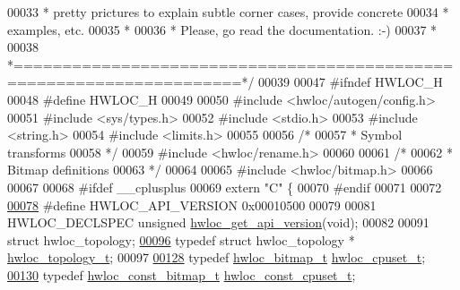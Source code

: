 \begin{DoxyCode}
00033 \textcolor{comment}{ * pretty prictures to explain subtle corner cases, provide concrete}
00034 \textcolor{comment}{ * examples, etc.}
00035 \textcolor{comment}{ *}
00036 \textcolor{comment}{ * Please, go read the documentation.  :-)}
00037 \textcolor{comment}{ *}
00038 \textcolor{comment}{ *=====================================================================*/}
00039 
00047 \textcolor{preprocessor}{#ifndef HWLOC\_H}
00048 \textcolor{preprocessor}{}\textcolor{preprocessor}{#define HWLOC\_H}
00049 \textcolor{preprocessor}{}
00050 \textcolor{preprocessor}{#include <hwloc/autogen/config.h>}
00051 \textcolor{preprocessor}{#include <sys/types.h>}
00052 \textcolor{preprocessor}{#include <stdio.h>}
00053 \textcolor{preprocessor}{#include <string.h>}
00054 \textcolor{preprocessor}{#include <limits.h>}
00055 
00056 \textcolor{comment}{/*}
00057 \textcolor{comment}{ * Symbol transforms}
00058 \textcolor{comment}{ */}
00059 \textcolor{preprocessor}{#include <hwloc/rename.h>}
00060 
00061 \textcolor{comment}{/*}
00062 \textcolor{comment}{ * Bitmap definitions}
00063 \textcolor{comment}{ */}
00064 
00065 \textcolor{preprocessor}{#include <hwloc/bitmap.h>}
00066 
00067 
00068 \textcolor{preprocessor}{#ifdef \_\_cplusplus}
00069 \textcolor{preprocessor}{}\textcolor{keyword}{extern} \textcolor{stringliteral}{"C"} \{
00070 \textcolor{preprocessor}{#endif}
00071 \textcolor{preprocessor}{}
00072 
\hypertarget{a00033_source_l00078}{}\hyperlink{a00038_ga8f4dfb8eef138af55dd1a0fa802e5476}{00078} \textcolor{preprocessor}{#define HWLOC\_API\_VERSION 0x00010500}
00079 \textcolor{preprocessor}{}
00081 HWLOC\_DECLSPEC \textcolor{keywordtype}{unsigned} \hyperlink{a00038_ga61ef7566efe550d314b0ce4f3421ec5d}{hwloc_get_api_version}(\textcolor{keywordtype}{void});
00082 
00091 \textcolor{keyword}{struct }hwloc\_topology;
\hypertarget{a00033_source_l00096}{}\hyperlink{a00039_ga9d1e76ee15a7dee158b786c30b6a6e38}{00096} \textcolor{keyword}{typedef} \textcolor{keyword}{struct }hwloc\_topology * \hyperlink{a00039_ga9d1e76ee15a7dee158b786c30b6a6e38}{hwloc_topology_t};
00097 
\hypertarget{a00033_source_l00128}{}\hyperlink{a00040_ga4bbf39b68b6f568fb92739e7c0ea7801}{00128} \textcolor{keyword}{typedef} \hyperlink{a00065_gaa3c2bf4c776d603dcebbb61b0c923d84}{hwloc_bitmap_t} \hyperlink{a00040_ga4bbf39b68b6f568fb92739e7c0ea7801}{hwloc_cpuset_t};
\hypertarget{a00033_source_l00130}{}\hyperlink{a00040_ga1f784433e9b606261f62d1134f6a3b25}{00130} \textcolor{keyword}{typedef} \hyperlink{a00065_ga2fb1bbc8aea1ea22dee2f0fd39659f48}{hwloc_const_bitmap_t} \hyperlink{a00040_ga1f784433e9b606261f62d1134f6a3b25}{hwloc_const_cpuset_t};

\end{DoxyCode}
